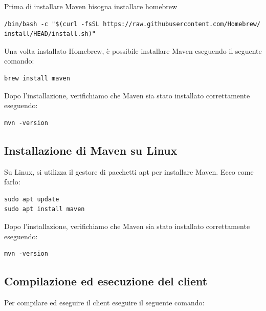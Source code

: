 \documentclass{article}
\newenvironment{commandbox}{%
  \begin{tcolorbox}[colback=white,colframe=black!50!white,sharp corners,width=\textwidth]%
  \ttfamily
}{%
  \end{tcolorbox}%
}
\begin{document}
 Prima di installare Maven bisogna installare homebrew


\begin{commandbox}
\begin{verbatim}
/bin/bash -c "$(curl -fsSL https://raw.githubusercontent.com/Homebrew/
install/HEAD/install.sh)"
\end{verbatim}
\end{commandbox}

Una volta installato Homebrew, è possibile installare Maven eseguendo il seguente comando:
\begin{commandbox}
\begin{verbatim}
brew install maven
\end{verbatim}
\end{commandbox}

Dopo l'installazione, verifichiamo che Maven sia stato installato correttamente eseguendo:

\begin{commandbox}
\begin{verbatim}
mvn -version
\end{verbatim}
\end{commandbox}


\subsection{Installazione di Maven su Linux}
Su Linux, si utilizza il gestore di pacchetti apt per installare Maven. Ecco come farlo:

\begin{commandbox}
\begin{verbatim}
sudo apt update
sudo apt install maven
\end{verbatim}
\end{commandbox}


Dopo l'installazione, verifichiamo che Maven sia stato installato correttamente eseguendo:

\begin{commandbox}
\begin{verbatim}
mvn -version
\end{verbatim}
\end{commandbox}

\subsection{Compilazione ed esecuzione del client}
Per compilare ed eseguire il client eseguire il seguente comando:
\end{document}
